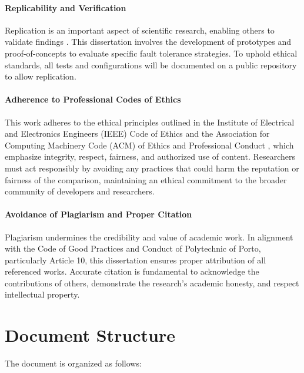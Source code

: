 \paragraph{Replicability and Verification} Replication is an important aspect of scientific research, enabling others to validate findings \cite{nspe-ethics}. This dissertation involves the development of prototypes and proof-of-concepts to evaluate specific fault tolerance strategies. To uphold ethical standards, all tests and configurations will be documented on a public repository to allow replication.

\paragraph{Adherence to Professional Codes of Ethics} This work adheres to the ethical principles outlined in the Institute of Electrical and Electronics Engineers (IEEE) Code of Ethics \cite{ieee-ethics} and the Association for Computing Machinery Code (ACM) of Ethics and Professional Conduct \cite{acm-ethics}, which emphasize integrity, respect, fairness, and authorized use of content. Researchers must act responsibly by avoiding any practices that could harm the reputation or fairness of the comparison, maintaining an ethical commitment to the broader community of developers and researchers.

\paragraph{Avoidance of Plagiarism and Proper Citation} Plagiarism undermines the credibility and value of academic work. In alignment with the Code of Good Practices and Conduct of Polytechnic of Porto, particularly Article 10, this dissertation ensures proper attribution of all referenced works. Accurate citation is fundamental to acknowledge the contributions of others, demonstrate the research’s academic honesty, and respect intellectual property.

\section{Document Structure}

The document is organized as follows:

